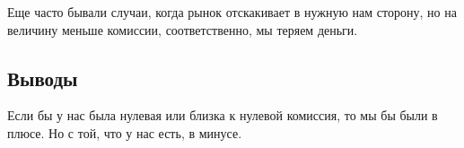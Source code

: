 Еще часто бывали случаи, когда рынок отскакивает в нужную нам сторону, но на величину меньше комиссии, соответственно, мы теряем деньги.

\subsection{Выводы}

Если бы у нас была нулевая или близка к нулевой комиссия, то мы бы были в плюсе. Но с той, что у нас есть, в минусе.